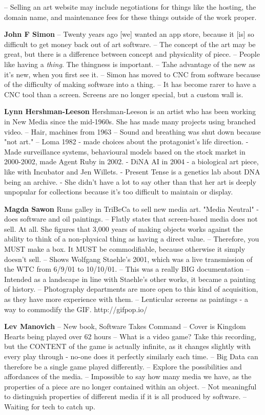 -- Selling an art website may include negotiations for things like the hosting, the domain name, and maintenance fees for these things outside of the work proper.

\textbf{John F Simon}
-- Twenty years ago [we] wanted an app store, because it [is] so difficult to get money back out of art software.
-- The concept of the art may be great, but there is a difference between concept and physicality of piece.
-- People like having a \textit{thing}. The thingness is important.
-- Tahe advantage of the new as it's new, when you first see it. 
-- Simon has moved to CNC from software because of the difficulty of making software into a thing.
-- It has become rarer to have a CNC tool than a screen. Screens are no longer special, but a custom wall is.

\textbf{Lynn Hershman-Leeson}
Hershman-Leeson is an artist who has been working in New Media since the mid-1960s. She has made many projects using branched video. 
-- Hair, machines from 1963 
-- Sound and breathing was shut down because "not art."
-- Loma 1982 - made choices about the protagonist's life direction. 
- Made surveillance systems, behavioural models based on the stock market in 2000-2002, made Agent Ruby in 2002.
- DiNA AI in 2004 - a biological art piece, like with Incubator and Jen Willets.
- Present Tense is a genetics lab about DNA being an archive.
- She didn't have a lot to say other than that her art is deeply unpopular for collections because it's too difficult to maintain or display.

\textbf{Magda Sawon}
Runs galley in TriBeCa to sell new media art. "Media Neutral" - does software and oil paintings.
-- Flatly states that screen-based media does not sell. At all. She figures that 3,000 years of making objects works against the ability to think of a non-physical thing as having a direct value.
-- Therefore, you MUST make a box. It MUST be commodifiable, because otherwise it simply doesn't sell.
-- Shows Wolfgang Staehle's 2001, which was a live transmission of the WTC from 6/9/01 to 10/10/01. 
-- This was a really BIG documentation
-- Intended as a landscape in line with Staehle's other works, it became a painting of history.
-- Photography departments are more open to this kind of acquisition, as they have more experience with them.
-- Lenticular screens as paintings - a way to commodify the GIF. http://gifpop.io/

\textbf{Lev Manovich}
-- New book, Software Takes Command
-- Cover is Kingdom Hearts being played over 62 hours
-- What is a video game? Take this recording, but the CONTENT of the game is actually infinite, as it changes slightly with every play through - no-one does it perfectly similarly each time.
-- Big Data can therefore be a single game played differently.
-- Explore the possibilities and affordances of the media.
-- Impossible to say how many media we have, as the properties of a piece are no longer contained within an object.
-- Not meaningful to distinguish properties of different media if it is all produced by software.
-- Waiting for tech to catch up.

